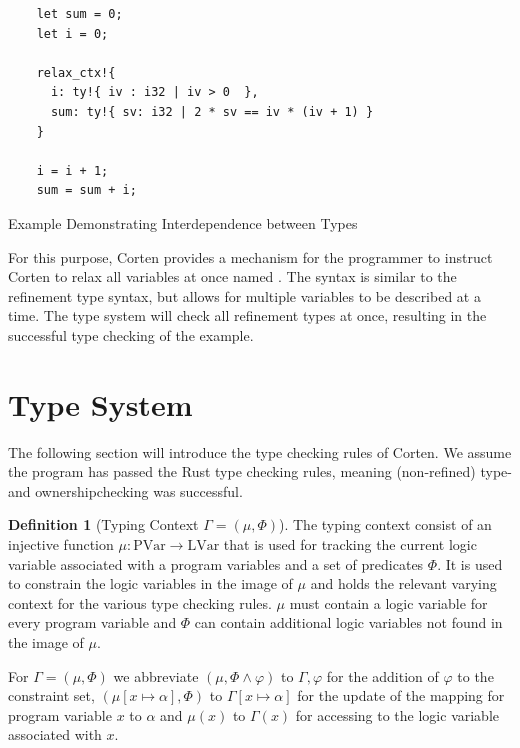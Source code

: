 \documentclass[twoside, english, final]{sdqthesis}
\theoremstyle{definition}
\newtheorem{definition}[theorem]{Definition}
\begin{document}
\begin{listing}[h]
  \begin{verbatim}
    let sum = 0;
    let i = 0;
    
    relax_ctx!{
      i: ty!{ iv : i32 | iv > 0  },
      sum: ty!{ sv: i32 | 2 * sv == iv * (iv + 1) }
    }

    i = i + 1;
    sum = sum + i;
  \end{verbatim}
  \caption{Example Demonstrating Interdependence between Types}
  \label{lst:mutual-reference}
\end{listing}

For this purpose, Corten provides a mechanism for the programmer to instruct Corten to relax all variables at once \- named . The syntax is similar to the refinement type syntax, but allows for multiple variables to be described at a time. The type system will check all refinement types at once, resulting in the successful type checking of the example.

\section{Type System} \label{sec:type-system}

The following section will introduce the type checking rules of Corten. We assume the program has passed the Rust type checking rules, meaning (non-refined) type- and ownership\Hyphdash{}checking was successful.

\begin{definition}[Typing Context $\Gamma = (\mu, \Phi)$]
  The typing context consist of an injective function $\mu : \text{PVar} \to \text{LVar}$ that is used for tracking the current logic variable associated with a program variables and a set of predicates $\Phi$.
  It is used to constrain the logic variables in the image of $\mu$ and holds the relevant varying context for the various type checking rules.
  $\mu$ must contain a logic variable for every program variable and $\Phi$ can contain additional logic variables not found in the image of $\mu$.

  For $\Gamma = (\mu, \Phi)$ we abbreviate $(\mu, \Phi \wedge \varphi)$ to $\Gamma, \varphi$ for the addition of $\varphi$ to the constraint set, $(\mu[x \mapsto \alpha], \Phi)$ to $\Gamma[x \mapsto \alpha]$ for the update of the mapping for program variable $x$ to $\alpha$ and 
  $\mu(x)$ to $\Gamma(x)$ for accessing to the logic variable associated with $x$.
\end{definition}
\end{document}
